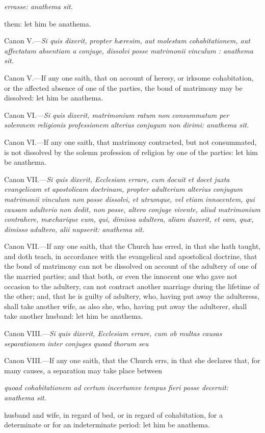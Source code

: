 \emph{errasse: anathema sit.}

them: let him be anathema.

Canon V.—\emph{Si quis dixerit, propter hæresim, aut molestam cohabitationem, aut affectatam absentiam a conjuge, dissolvi posse matrimonii vinculum : anathema sit.}

Canon V.—If any one saith, that on account of heresy, or irksome cohabitation, or the affected absence of one of the parties, the bond of matrimony may be dissolved: let him be anathema.

Canon VI.—\emph{Si quis dixerit, matrimonium ratum non consummatum per solemnem religionis professionem alterius conjugum non dirimi: anathema sit.}

Canon VI.—If any one saith, that matrimony contracted, but not consummated, is not dissolved by the solemn profession of religion by one of the parties: let him be anathema.

Canon VII.—\emph{Si quis dixerit, Ecclesiam errare, cum docuit et docet juxta evangelicam et apostolicam doctrinam, propter adulterium alterius conjugum matrimonii vinculum non posse dissolvi, et utrumque, vel etiam innocentem, qui causam adulterio non dedit, non posse, altero conjuge vivente, aliud matrimonium contrahere, mæcharique eum, qui, dimissa adultera, aliam duxerit, et eam, quæ, dimisso adultero, alii nupserit: anathema sit.}

Canon VII.—If any one saith, that the Church has erred, in that she hath taught, and doth teach, in accordance with the evangelical and apostolical doctrine, that the bond of matrimony can not be dissolved on account of the adultery of one of the married parties; and that both, or even the innocent one who gave not occasion to the adultery, can not contract another marriage during the lifetime of the other; and, that he is guilty of adultery, who, having put away the adulteress, shall take another wife, as also she, who, having put away the adulterer, shall take another husband: let him be anathema.

Canon VIII.—\emph{Si quis dixerit, Ecclesiam errare, cum ob multas causas separationem inter conjuges quoad thorum seu }

Canon VIII.—If any one saith, that the Church errs, in that she declares that, for many causes, a separation may take place between

\emph{quoad cohabitationem ad certum incertumve tempus fieri posse decernit: anathema sit.}

husband and wife, in regard of bed, or in regard of cohabitation, for a determinate or for an indeterminate period: let him be anathema.

